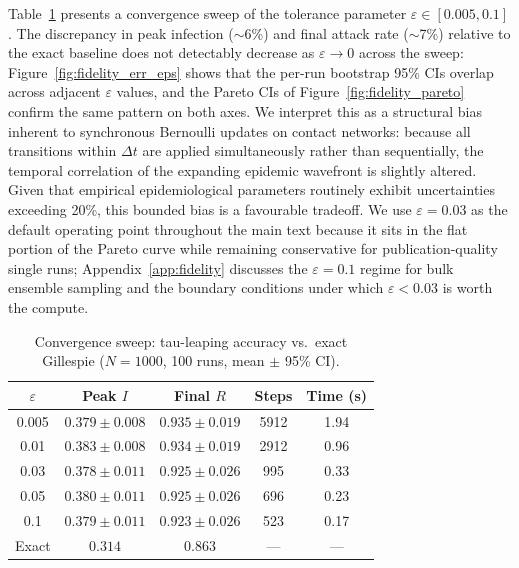 \documentclass[a4paper,fleqn]{cas-sc}
\theoremstyle{definition}
\theoremstyle{remark}
\begin{document}
Table~\ref{tab:epsilon_sweep} presents a convergence sweep of the tolerance parameter $\varepsilon \in [0.005, 0.1]$. The discrepancy in peak infection ($\sim$6\%) and final attack rate ($\sim$7\%) relative to the exact baseline does not detectably decrease as $\varepsilon \to 0$ across the sweep: Figure~\ref{fig:fidelity_err_eps} shows that the per-run bootstrap 95\% CIs overlap across adjacent $\varepsilon$ values, and the Pareto CIs of Figure~\ref{fig:fidelity_pareto} confirm the same pattern on both axes. We interpret this as a structural bias inherent to synchronous Bernoulli updates on contact networks: because all transitions within $\Delta t$ are applied simultaneously rather than sequentially, the temporal correlation of the expanding epidemic wavefront is slightly altered. Given that empirical epidemiological parameters routinely exhibit uncertainties exceeding 20\%, this bounded bias is a favourable tradeoff. We use $\varepsilon = 0.03$ as the default operating point throughout the main text because it sits in the flat portion of the Pareto curve while remaining conservative for publication-quality single runs; Appendix~\ref{app:fidelity} discusses the $\varepsilon = 0.1$ regime for bulk ensemble sampling and the boundary conditions under which $\varepsilon < 0.03$ is worth the compute.

\begin{table}[!h]
\caption{Convergence sweep: tau-leaping accuracy vs.\ exact Gillespie ($N=1000$, 100 runs, mean $\pm$ 95\% CI).}
\label{tab:epsilon_sweep}
\centering
\begin{tabular*}{\tblwidth}{@{}ccccc@{}}
\toprule
$\varepsilon$ & Peak $I$ & Final $R$ & Steps & Time (s) \\
\midrule
0.005 & $0.379 \pm 0.008$ & $0.935 \pm 0.019$ & 5912 & 1.94 \\
0.01 & $0.383 \pm 0.008$ & $0.934 \pm 0.019$ & 2912 & 0.96 \\
0.03 & $0.378 \pm 0.011$ & $0.925 \pm 0.026$ & 995 & 0.33 \\
0.05 & $0.380 \pm 0.011$ & $0.925 \pm 0.026$ & 696 & 0.23 \\
0.1 & $0.379 \pm 0.011$ & $0.923 \pm 0.026$ & 523 & 0.17 \\
\midrule
Exact & $0.314$ & $0.863$ & --- & --- \\
\bottomrule
\end{tabular*}
\end{table}
\end{document}
